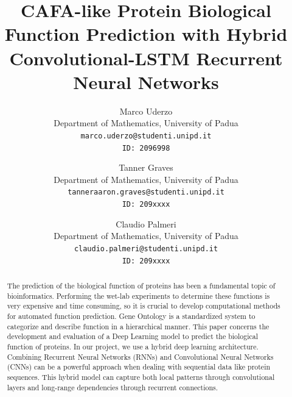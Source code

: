 \documentclass[10pt,twocolumn,letterpaper]{article}
\begin{document}

\title{CAFA-like Protein Biological Function Prediction with Hybrid Convolutional-LSTM Recurrent Neural Networks}

\author{
Marco Uderzo\\
{\small Department of Mathematics, University of Padua}\\
{\tt\small marco.uderzo@studenti.unipd.it}\\
{\tt\small ID: 2096998} \\
\and
Tanner Graves\\
{\small Department of Mathematics, University of Padua}\\
{\tt\small tanneraaron.graves@studenti.unipd.it}\\
{\tt\small ID: 209xxxx} \\
\and
Claudio Palmeri \\
{\small Department of Mathematics, University of Padua}\\
{\tt\small claudio.palmeri@studenti.unipd.it}\\
{\tt\small ID: 209xxxx} \\
}


\maketitle


\begin{abstract}
    The prediction of the biological function of proteins has been a fundamental topic of bioinformatics. Performing the wet-lab experiments 
    to determine these functions is very expensive and time consuming, so it is crucial to develop computational 
    methods for automated function prediction. Gene Ontology is a standardized system to categorize and describe function 
    in a hierarchical manner.
    This paper concerns the development and evaluation of a Deep Learning model to predict the biological function of proteins.
    In our project, we use a hybrid deep learning architecture. Combining Recurrent Neural Networks (RNNs) and Convolutional Neural Networks (CNNs) can be a powerful approach when dealing 
    with sequential data like protein sequences. This hybrid model can capture both local patterns through convolutional layers and long-range dependencies through recurrent connections.
\end{abstract}
\end{document}
